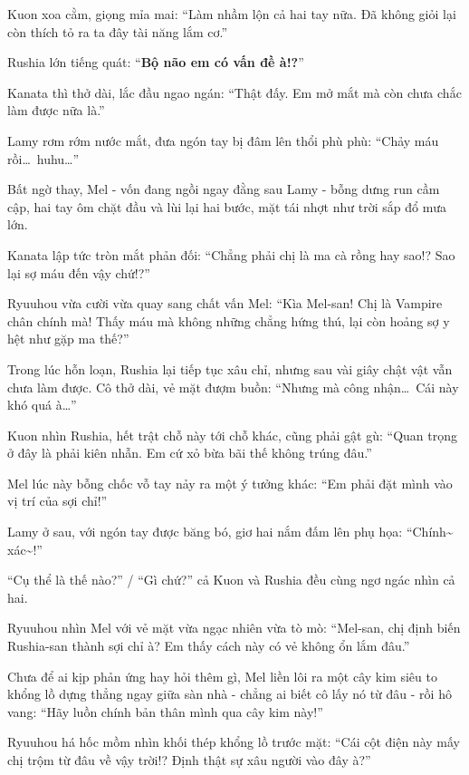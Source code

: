 \documentclass[../main.tex]{subfiles}
\begin{document}
Kuon xoa cằm, giọng mỉa mai: ``Làm nhầm lộn cả hai tay nữa. Đã không giỏi lại còn thích tỏ ra ta đây tài năng lắm cơ.''

Rushia lớn tiếng quát: ``\textbf{Bộ não em có vấn đề à!?}''

Kanata thì thở dài, lắc đầu ngao ngán: ``Thật đấy. Em mở mắt mà còn chưa chắc làm được nữa là.''

Lamy rơm rớm nước mắt, đưa ngón tay bị đâm lên thổi phù phù: ``Chảy máu rồi\dots\ huhu\dots''

Bất ngờ thay, Mel - vốn đang ngồi ngay đằng sau Lamy - bỗng dưng run cầm cập, hai tay ôm chặt đầu và lùi lại hai bước, mặt tái nhợt như trời sắp đổ mưa lớn.

Kanata lập tức tròn mắt phản đối: ``Chẳng phải chị là ma cà rồng hay sao!? Sao lại sợ máu đến vậy chứ!?''


Ryuuhou vừa cười vừa quay sang chất vấn Mel: ``Kìa Mel-san! Chị là Vampire chân chính mà! Thấy máu mà không những chẳng hứng thú, lại còn hoảng sợ y hệt như gặp ma thế?''

Trong lúc hỗn loạn, Rushia lại tiếp tục xâu chỉ, nhưng sau vài giây chật vật vẫn chưa làm được. Cô thở dài, vẻ mặt đượm buồn: ``Nhưng mà công nhận\dots\ Cái này khó quá à\dots''

Kuon nhìn Rushia, hết trật chỗ này tới chỗ khác, cũng phải gật gù: ``Quan trọng ở đây là phải kiên nhẫn. Em cứ xỏ bừa bãi thế không trúng đâu.''

Mel lúc này bỗng chốc vỗ tay nảy ra một ý tưởng khác: ``Em phải đặt mình vào vị trí của sợi chỉ!''

Lamy ở sau, với ngón tay được băng bó, giơ hai nắm đấm lên phụ họa: ``Chính\~{} xác\~{}!''

``Cụ thể là thế nào?'' / ``Gì chứ?'' cả Kuon và Rushia đều cùng ngơ ngác nhìn cả hai.

Ryuuhou nhìn Mel với vẻ mặt vừa ngạc nhiên vừa tò mò: ``Mel-san, chị định biến Rushia-san thành sợi chỉ à? Em thấy cách này có vẻ không ổn lắm đâu.''

Chưa để ai kịp phản ứng hay hỏi thêm gì, Mel liền lôi ra một cây kim siêu to khổng lồ dựng thẳng ngay giữa sàn nhà - chẳng ai biết cô lấy nó từ đâu - rồi hô vang: ``Hãy luồn chính bản thân mình qua cây kim này!''


Ryuuhou há hốc mồm nhìn khối thép khổng lồ trước mặt: ``Cái cột điện này mấy chị trộm từ đâu về vậy trời!? Định thật sự xâu người vào đây à?''
\end{document}
